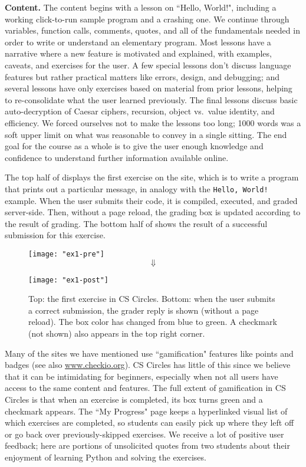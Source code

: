 \documentclass{article}
\begin{document}
{{\bf Content.} The content begins with a lesson on ``Hello, World!", including a working click-to-run sample program and a crashing one. We continue through variables, function calls, comments, quotes, and all of the fundamentals needed in order to write or understand an elementary program. Most lessons have a narrative where a new feature is motivated and explained, with examples, caveats, and exercises for the user. A few special lessons don't discuss language features but rather practical matters like errors, design, and debugging; and several lessons have only exercises based on material from prior lessons, helping to re-consolidate what the user learned previously. The final lessons discuss basic auto-decryption of Caesar ciphers, recursion, object vs.~value identity, and efficiency. We forced ourselves not to make the lessons too long; 1000 words was a soft upper limit on what was reasonable to convey in a single sitting. The end goal for the course as a whole is to give the user enough knowledge and confidence to understand further information available online. 

The top half of  displays the first exercise on the site, which is to write a program that prints out a particular message, in analogy with the {\tt Hello, World!} example. When the user submits their code, it is compiled, executed, and graded server-side. Then, without a page reload, the grading box is updated according to the result of grading. The bottom half of  shows the result of a successful submission for this exercise.

\begin{figure}[tb!]
\centering
\texttt{[image: "ex1-pre"]} \vspace{0em}$$\Downarrow$$

\texttt{[image: "ex1-post"]}
\caption{Top: the first exercise in CS Circles. Bottom: when the user submits a correct submission, the grader reply is shown (without a page reload). The box color has changed from blue to green. A checkmark (not shown) also appears in the top right corner.}\label{fig:hello}
\end{figure}

Many of the sites we have mentioned use ``gamification" features like points and badges (see also \url{www.checkio.org}). CS Circles has little of this since we believe that it can be intimidating for beginners, especially when not all users have access to the same content and features. The full extent of gamification in CS Circles is that when an exercise is completed, its box turns green and a checkmark appears. The ``My Progress" page keeps a hyperlinked visual list of which exercises are completed, so students can easily pick up where they left off or go back over previously-skipped exercises. We receive a lot of positive user feedback; here are portions of unsolicited quotes from two students about their enjoyment of learning Python and solving the exercises.

}
\end{document}
